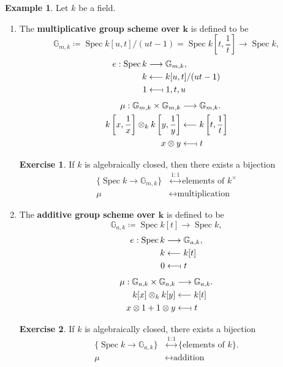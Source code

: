 \documentclass[12pt]{article}
\DeclareMathOperator{\Spec}{Spec}
\theoremstyle{definition}
\newtheorem*{exercise}{Exercise}
\newtheorem*{example}{Example}
\begin{document}
\begin{example}
Let $k$ be a field.

\begin{enumerate}[label=\arabic*)]
\item The \textbf{multiplicative group scheme over $\boldsymbol{k}$} is defined to be
\[\mathbb{G}_{m,k}\coloneqq\Spec k[u,t]/(ut-1)=\Spec k\left[t,\frac{1}{t}\right]\longrightarrow\Spec k,\]
\begin{align*}
e:\Spec k&\longrightarrow\mathbb{G}_{m,k},\\
k&\longleftarrow k[u,t]/(ut-1)\\
1&\longleftarrow\!\shortmid1,t,u
\end{align*}
\begin{align*}
\mu:\mathbb{G}_{m,k}\times\mathbb{G}_{m,k}&\longrightarrow\mathbb{G}_{m,k}.\\
k\left[x,\frac{1}{x}\right]\otimes_k k\left[y,\frac{1}{y}\right]&\longleftarrow k\left[t,\frac{1}{t}\right]\\
x\otimes y&\longleftarrow\!\shortmid t
\end{align*}

\begin{exercise}
If $k$ is algebraically closed, then there exists a bijection
\begin{align*}
\{\Spec k\rightarrow\mathbb{G}_{m,k}\}&\overset{1:1}{\longleftrightarrow}\text{elements of }k^{\times}\\
\mu&\longleftrightarrow\text{multiplication}
\end{align*}
\end{exercise}

\item The \textbf{additive group scheme over $\boldsymbol{k}$} is defined to be
\[\mathbb{G}_{a,k}\coloneqq\Spec k[t]\longrightarrow\Spec k,\]
\begin{align*}
e:\Spec k&\longrightarrow\mathbb{G}_{a,k},\\
k&\longleftarrow k[t]\\
0&\longleftarrow\!\shortmid t
\end{align*}
\begin{align*}
\mu:\mathbb{G}_{a,k}\times\mathbb{G}_{a,k}&\longrightarrow\mathbb{G}_{a,k}.\\
k[x]\otimes_kk[y]&\longleftarrow k[t]\\
x\otimes1+1\otimes y&\longleftarrow\!\shortmid t
\end{align*}

\begin{exercise}
If $k$ is algebraically closed, there exists a bijection
\begin{align*}
\{\Spec k\rightarrow\mathbb{G}_{a,k}\}&\overset{1:1}{\longleftrightarrow}\{\text{elements of }k\}.\\
\mu&\longleftrightarrow\text{addition}
\end{align*}
\end{exercise}


\end{enumerate}
\end{example}
\end{document}

